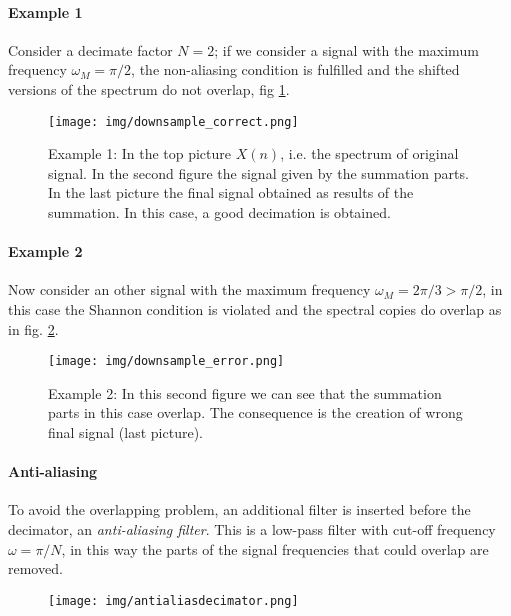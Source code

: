 \paragraph{Example 1} Consider a decimate factor $N=2$; if we consider a signal with the maximum frequency $\omega_M = \pi /2$, the non-aliasing condition is fulfilled and the shifted versions of the spectrum do not overlap, fig \ref{fig:example1}.
\begin{figure}[h]\centering
\texttt{[image: img/downsample\_correct.png]} 
\caption{Example 1: In the top picture $X(n)$, i.e. the spectrum of original signal. In the second figure the signal given by the summation parts. In the last picture the final signal obtained as results of the summation. In this case, a good decimation is obtained.} \label{fig:example1}
\end{figure}
\paragraph{Example 2} Now consider an other signal with the maximum frequency  $\omega_M = 2\pi /3 > \pi/2$, in this case the Shannon condition is violated and the spectral copies do overlap as in fig. \ref{fig:example2}.
\begin{figure}[h]\centering
\texttt{[image: img/downsample\_error.png]} 
\caption{Example 2: In this second figure we can see that the summation parts in this case overlap. The consequence is the creation of wrong final signal (last picture).} \label{fig:example2}
\end{figure}
\paragraph{Anti-aliasing} To avoid the overlapping problem, an additional filter is inserted before the decimator, an \textit{anti-aliasing filter}. This is a low-pass filter with cut-off frequency $\omega=\pi/N$, in this way the parts of the signal frequencies that could overlap are removed.
\begin{figure}[H]\centering
\texttt{[image: img/antialiasdecimator.png]} 
\end{figure}


